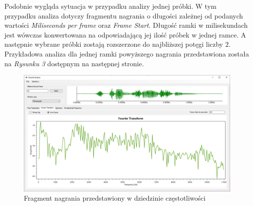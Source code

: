 \documentclass[a4paper]{article}
\begin{document}
Podobnie wygląda sytuacja w przypadku analizy jednej próbki. W tym przypadku analiza dotyczy fragmentu nagrania o długości zależnej od podanych wartości \textit{Miliseconds per frame} oraz \textit{Frame Start}. Długość ramki w milisekundach jest wówczas konwertowana na odpowiadającą jej ilość próbek w jednej ramce. A następnie wybrane próbki zostają rozszerzone do najbliższej potęgi liczby $2$.\\
Przykładowa analiza dla jednej ramki powyższego nagrania przedstawiona została na \textit{Rysunku 3} dostępnym na następnej stronie.
\begin{figure}[H]
  \includegraphics[width=\linewidth]{images/03fourierInFrame.png}
  \caption{Fragment nagrania przedstawiony w dziedzinie częstotliwości}
\end{figure}
\end{document}
